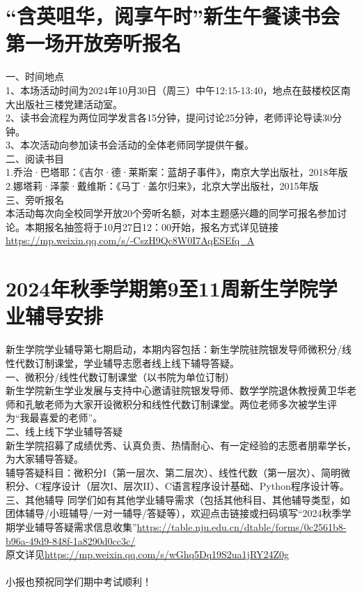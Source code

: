 \documentclass[letterpaper, 12pt]{article}
\begin{document}
\begin{multicols}{2}
\section{“含英咀华，阅享午时”新生午餐读书会第一场开放旁听报名}
一、时间地点\\
1、本场活动时间为2024年10月30日（周三）中午12:15-13:40，地点在鼓楼校区南大出版社三楼党建活动室。\\
2、读书会流程为两位同学发言各15分钟，提问讨论25分钟，老师评论导读30分钟。\\
3、本次活动向参加读书会活动的全体老师同学提供午餐。\\
二、阅读书目\\
1.乔治·巴塔耶：《吉尔·德·莱斯案：蓝胡子事件》，南京大学出版社，2018年版\\
2.娜塔莉·泽蒙·戴维斯：《马丁·盖尔归来》，北京大学出版社，2015年版\\
三、旁听报名\\
本活动每次向全校同学开放20个旁听名额，对本主题感兴趣的同学可报名参加讨论。本期报名抽签将于10月27日12：00开始，报名方式详见链接\url{https://mp.weixin.qq.com/s/-CszH9Qc8W0I7AqESEfq_A}\\

\section{2024年秋季学期第9至11周新生学院学业辅导安排}
新生学院学业辅导第七期启动，本期内容包括：新生学院驻院银发导师微积分/线性代数订制课堂，学业辅导志愿者线上线下辅导答疑。\\
一、微积分/线性代数订制课堂（以书院为单位订制）\\
新生学院新生学业发展与支持中心邀请驻院银发导师、数学学院退休教授黄卫华老师和孔敏老师为大家开设微积分和线性代数订制课堂。两位老师多次被学生评为“我最喜爱的老师”。\\
二、线上线下学业辅导答疑\\
新生学院招募了成绩优秀、认真负责、热情耐心、有一定经验的志愿者朋辈学长，为大家辅导答疑。\\
辅导答疑科目：微积分I（第一层次、第二层次）、线性代数（第一层次）、简明微积分、C程序设计（层次I、层次II）、C语言程序设计基础、Python程序设计等。\\
三、其他辅导
同学们如有其他学业辅导需求（包括其他科目、其他辅导类型，如团体辅导/小班辅导/一对一辅导/答疑等），欢迎点击链接或扫码填写“2024秋季学期学业辅导答疑需求信息收集”\url{https://table.nju.edu.cn/dtable/forms/0c2561b8-b96a-49d9-848f-1a8290d0cc3c/}\\
原文详见\url{https://mp.weixin.qq.com/s/wGhq5Dq19S2ua1jRY24Z0g}\\
\\
小报也预祝同学们期中考试顺利！



\end{multicols}
\end{document}
